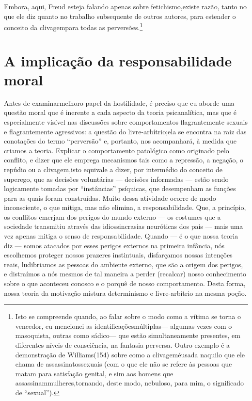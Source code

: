 Embora, aqui, Freud esteja falando apenas sobre fetichismo,\idxfeticfreu[|)] existe
razão, tanto no que ele diz quanto no trabalho subsequente de outros
autores, para estender o conceito da clivagem\idxcliv[|)] para todas as
perversões.\footnote{ Isto se compreende quando, ao falar sobre o modo
como a vítima se torna o vencedor, eu mencionei as identificações\idxmulti[|nn]
múltiplas\idxidentmult[|nn] --- algumas vezes com o masoquista, outras com\idxsadi[|nn] o sádico\idxmasoq[|nn] ---
que estão simultaneamente presentes, em diferentes níveis de
consciência, na fantasia perversa. Outro exemplo é a demonstração de
Williams\idxwill[|nn] (154) sobre como a clivagem\idxconfcliv[|nn] é\idxcliv[|nn] usada naquilo que ele chama de
assassinatos\idxassas[|nn] sexuais (com o que ele não se refere às pessoas que matam
para satisfação genital, e sim aos homens que assassinam\idxfreudfetic[|)] mulheres,\idxfreudaberr[|)]
tornando, deste modo, nebuloso, para mim, o significado de
``sexual'').}




\section{A implicação da responsabilidade moral}

Antes de examinar\idxpervrespo[|(] melhor\idxrespo[|(] o papel da hostilidade, é preciso que eu
aborde uma questão moral que é inerente a cada aspecto da teoria
psicanalítica, mas que é especialmente visível nas discussões sobre
comportamentos flagrantemente sexuais e flagrantemente agressivos: a
questão do livre-arbítrio;\idxlivre[|(] ela se encontra na raiz das conotações do
termo ``perversão'' e, portanto, nos
acompanhará, à medida que criamos a teoria. Explicar o comportamento
patológico como originado pelo conflito, e dizer que ele emprega
mecanismos tais como a repressão, a negação, o repúdio ou a clivagem,\idxconfcliv[|)]
isto equivale a dizer, por intermédio do conceito de superego, que as
decisões voluntárias --- decisões informadas --- estão sendo
logicamente tomadas por ``instâncias''
psíquicas, que desempenham as funções para as quais foram construídas.
Muito dessa atividade ocorre de modo inconsciente, o que mitiga, mas
não elimina, a responsabilidade. Que, a princípio, os conflitos emerjam
dos perigos do mundo externo --- os costumes que a sociedade
transmitiu através das idiossincrasias neuróticas dos pais --- mais
uma vez apenas mitiga o senso de responsabilidade. Quando --- é o que
nossa teoria diz --- somos atacados por esses perigos externos na
primeira infância, nós escolhemos proteger nossos prazeres instintuais,
disfarçamos nossas intenções reais, ludibriamos as pessoas do ambiente
externo, que são a origem dos perigos, e distraímos a nós mesmos de tal
maneira a perder (recalcar) nosso conhecimento sobre o que aconteceu
conosco e o porquê de nosso comportamento. Desta forma, nossa teoria
da motivação mistura determinismo e livre-arbítrio na mesma poção.

